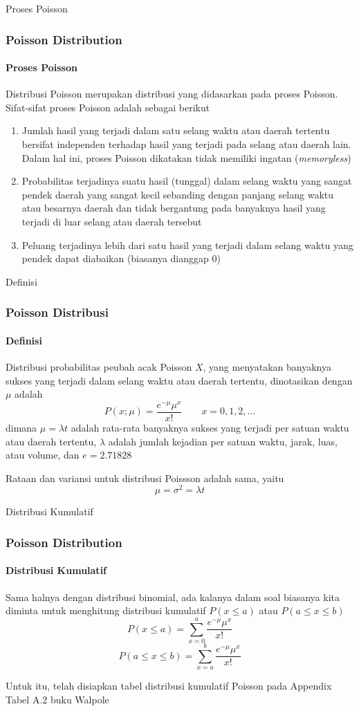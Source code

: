 \documentclass[]{beamer}
\begin{document}
\begin{frame}{Proses Poisson}
    \frametitle{Poisson Distribution}
    \framesubtitle{Proses Poisson}
     Distribusi Poisson merupakan distribusi yang didasarkan pada proses Poisson. Sifat-sifat proses Poisson adalah sebagai berikut
        \begin{enumerate}
            \item Jumlah hasil yang terjadi dalam satu selang waktu atau daerah tertentu bersifat independen terhadap hasil yang terjadi pada selang atau daerah lain. Dalam hal ini, proses Poisson dikatakan tidak memiliki ingatan (\textit{memoryless})
            \item Probabilitas terjadinya suatu hasil (tunggal) dalam selang waktu yang sangat pendek daerah yang sangat kecil sebanding dengan panjang selang waktu atau besarnya daerah dan tidak bergantung pada banyaknya hasil yang terjadi di luar selang atau daerah tersebut
            \item  Peluang terjadinya lebih dari satu hasil yang terjadi dalam selang waktu yang pendek dapat diabaikan (biasanya dianggap 0)
        \end{enumerate}
\end{frame}

\begin{frame}{Definisi}
    \frametitle{Poisson Distribusi}
    \framesubtitle{Definisi}
    Distribusi probabilitas peubah acak Poisson $X$, yang menyatakan banyaknya sukses yang terjadi dalam selang waktu atau daerah tertentu, dinotasikan dengan $\mu$ adalah
    \begin{equation*}
        P(x;\mu)=\frac{e^{-\mu}\mu^x}{x!} \qquad x=0,1,2,\dots
    \end{equation*}
    dimana $\mu=\lambda t$ adalah rata-rata banyaknya sukses yang terjadi per satuan waktu atau daerah tertentu, $\lambda$ adalah jumlah kejadian per satuan waktu, jarak, luas, atau volume, dan $e=2.71828$ 

    \bigskip

    Rataan dan variansi untuk distribusi Poissson adalah sama, yaitu
    \begin{equation*}
        \mu=\sigma^2=\lambda t
    \end{equation*}
\end{frame}

\begin{frame}{Distribusi Kumulatif}
    \frametitle{Poisson Distribution}
    \framesubtitle{Distribusi Kumulatif}
    Sama halnya dengan distribusi binomial, ada kalanya dalam soal biasanya kita diminta untuk menghitung distribusi kumulatif $P(x\le a) $ atau $P(a\le x\le b) $
    \begin{equation*}
        P(x\le a) = \sum_{x=0}^a \frac{e^{-\mu}\mu^x}{x!}
    \end{equation*}
    \begin{equation*}
        P(a\le x\le b) = \sum_{x=a}^b \frac{e^{-\mu}\mu^x}{x!}
    \end{equation*}
    
    \bigskip

    Untuk itu, telah disiapkan tabel distribusi kumulatif Poisson pada Appendix Tabel A.2 buku Walpole
\end{frame}
\end{document}
